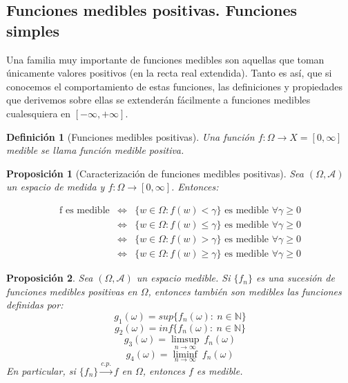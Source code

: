 \documentclass[11pt, a4paper]{article}
\newif\IfInSansMode
\newcommand{\fn}{\{f_n\}}
\theoremstyle{theorem-style}
\newtheorem{nprop}{Proposición}[section]
\theoremstyle{definition-style}
\newtheorem{ndef}{Definición}[section]
\theoremstyle{remark-style}
\theoremstyle{example-style}
\begin{document}

\subsection{Funciones medibles positivas. Funciones simples}

Una familia muy importante de funciones medibles son aquellas que toman únicamente valores positivos (en la recta real extendida). Tanto es así, que si conocemos el comportamiento de estas funciones, las definiciones y propiedades que derivemos sobre ellas se extenderán fácilmente a funciones medibles cualesquiera en $[-\infty,+\infty]$.

\begin{ndef}[Funciones medibles positivas]
  Una función $f: \Omega \to X = [0,\infty ]$ medible se llama función medible positiva.
\end{ndef}


\begin{nprop}[Caracterización de funciones medibles positivas] \label{criterio_medibles} Sea $(\Omega,\mathscr A)$ un espacio de medida y $f:\Omega \to [0,\infty]$. Entonces: 
  
  \[
  \begin{array}{lll}
    \text{f es medible} & \iff & \{w \in \Omega : f(w) < \gamma \} \text{ es medible } \forall \gamma \geq 0\\

    & \iff & \{w \in \Omega : f(w) \leq \gamma \} \text{ es medible } \forall \gamma \geq 0\\

    & \iff & \{w \in \Omega : f(w) > \gamma \} \text{ es medible } \forall \gamma \geq 0\\

    & \iff & \{w \in \Omega : f(w) \geq \gamma \} \text{ es medible } \forall \gamma \geq 0
    \end{array}
  \]
\end{nprop}

\begin{nprop} \label {p1}
  Sea $(\Omega,\mathscr A)$ un espacio medible. Si $\{f_n\}$ es una sucesión de funciones medibles positivas en $\Omega$, entonces también son medibles las funciones definidas por:
  \[
    g_1(\omega) =  sup\{f_n(\omega) : \ n \in \mathbb{N} \}
  \]
  \[
    g_2(\omega) =  inf\{f_n(\omega) : \ n \in \mathbb{N} \}
  \]
  \[
    g_3(\omega) = \limsup_{n\to \infty} \ f_n(\omega)
  \]
  \[
    g_4(\omega) = \liminf_{n\to \infty}  \ f_n(\omega)
  \]
  En particular, si $\fn \xrightarrow{c.p.} f$ en $\Omega$, entonces $f$ es medible.
\end{nprop}
\end{document}
